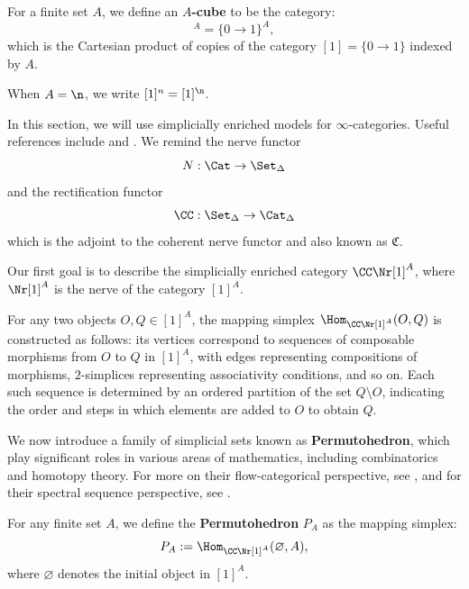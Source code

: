 \begin{defn}
For a finite set $A$, we define an \textbf{$A$-cube} to be the category:
\begin{equation*}
    [1]^A = \{ 0 \to 1 \}^A,
\end{equation*}
which is the Cartesian product of copies of the category $[1] = \{ 0 \to 1 \}$ indexed by $A$.
\end{defn}

When $A = \n$, we write $[1]^n = [1]^{\n}$.

In this section, we will use simplicially enriched models for $\infty$-categories. Useful references include \cite[\href{https://kerodon.net/tag/00JN}{Tag~00JN}]{kerodon} and \cite[Section~1.1.5]{Lur09}.
We remind the nerve functor
\begin{equation*}
    N: \Cat \to \Set_{\Delta}
\end{equation*}
and the rectification functor
\begin{equation*}
    \CC: \Set_{\Delta} \to \Cat_{\Delta}
\end{equation*}
which is the adjoint to the coherent nerve functor and  also known as $\mathfrak{C}$.

Our first goal is to describe the simplicially enriched category $\CC \Nr [1]^A$, where $\Nr [1]^A$ is the nerve of the category $[1]^A$.

For any two objects $O, Q \in [1]^A$, the mapping simplex $\Hom_{\CC \Nr [1]^A}(O, Q)$ is constructed as follows: its vertices correspond to sequences of composable morphisms from $O$ to $Q$ in $[1]^A$, with edges representing compositions of morphisms, $2$-simplices representing associativity conditions, and so on. Each such sequence is determined by an ordered partition of the set $Q \setminus O$, indicating the order and steps in which elements are added to $O$ to obtain $Q$.

We now introduce a family of simplicial sets known as \textbf{Permutohedron}, which play significant roles in various areas of mathematics, including combinatorics and homotopy theory. For more on their flow-categorical perspective, see \cite{LLS20}, and for their spectral sequence perspective, see \cite{blanc2022spectral}.

\begin{defn}
For any finite set $A$, we define the \textbf{Permutohedron} $P_A$ as the mapping simplex:
\begin{equation*}
    P_A := \Hom_{\CC \Nr [1]^A}(\varnothing, A),
\end{equation*}
where $\varnothing$ denotes the initial object in $[1]^A$.
\end{defn}

